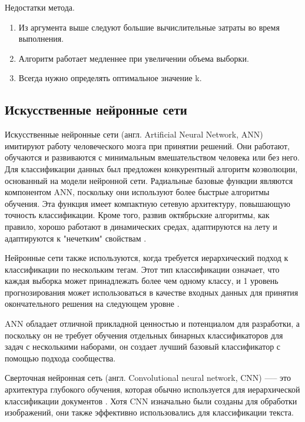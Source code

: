 Недостатки метода.
\begin{enumerate}
	\item Из аргумента выше следуют большие вычислительные затраты во время выполнения.
	\item Алгоритм работает медленнее при увеличении объема выборки.
	\item Всегда нужно определять оптимальное значение k.
\end{enumerate}

\subsection{Искусственные нейронные сети}
Искусственные нейронные сети (англ. Artificial Neural Network, ANN) имитируют работу человеческого мозга при принятии решений. Они работают, обучаются и развиваются с минимальным вмешательством человека или без него. Для классификации данных был предложен конкурентный алгоритм коэволюции, основанный на модели нейронной сети. Радиальные базовые функции являются компонентом ANN, поскольку они используют более быстрые алгоритмы обучения. Эта функция имеет компактную сетевую архитектуру, повышающую точность классификации. Кроме того, развив октябрьские алгоритмы, как правило, хорошо работают в динамических средах, адаптируются на лету и адаптируются к "нечетким" свойствам \cite{9}.

Нейронные сети также используются, когда требуется иерархический подход к классификации по нескольким тегам. Этот тип классификации означает, что каждая выборка может принадлежать более чем одному классу, и 1 уровень прогнозирования может использоваться в качестве входных данных для принятия окончательного решения на следующем уровне \cite{10}. 

ANN обладает отличной прикладной ценностью и потенциалом для разработки, а поскольку он не требует обучения отдельных бинарных классификаторов для задач с несколькими наборами, он создает лучший базовый классификатор с помощью подхода сообщества.

Сверточная нейронная сеть (англ. Convolutional neural network, CNN) —-- это архитектура глубокого обучения, которая обычно используется для иерархической классификации документов \cite{6}. Хотя CNN изначально были созданы для обработки изображений, они также эффективно использовались для классификации текста\cite{27}.

